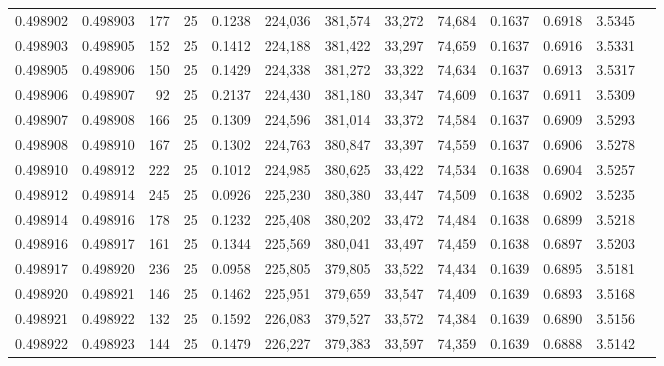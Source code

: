 \begin{tabular}{rrrrrrrrrrrrr}
0.498902 & 0.498903 & 177 &  25 &                                     0.1238 & 224,036 & 381,574 &  33,272 &  74,684 & 0.1637 & 0.6918 & 3.5345 \\
0.498903 & 0.498905 & 152 &  25 &                                     0.1412 & 224,188 & 381,422 &  33,297 &  74,659 & 0.1637 & 0.6916 & 3.5331 \\
0.498905 & 0.498906 & 150 &  25 &                                     0.1429 & 224,338 & 381,272 &  33,322 &  74,634 & 0.1637 & 0.6913 & 3.5317 \\
0.498906 & 0.498907 &  92 &  25 &                                     0.2137 & 224,430 & 381,180 &  33,347 &  74,609 & 0.1637 & 0.6911 & 3.5309 \\
0.498907 & 0.498908 & 166 &  25 &                                     0.1309 & 224,596 & 381,014 &  33,372 &  74,584 & 0.1637 & 0.6909 & 3.5293 \\
0.498908 & 0.498910 & 167 &  25 &                                     0.1302 & 224,763 & 380,847 &  33,397 &  74,559 & 0.1637 & 0.6906 & 3.5278 \\
0.498910 & 0.498912 & 222 &  25 &                                     0.1012 & 224,985 & 380,625 &  33,422 &  74,534 & 0.1638 & 0.6904 & 3.5257 \\
0.498912 & 0.498914 & 245 &  25 &                                     0.0926 & 225,230 & 380,380 &  33,447 &  74,509 & 0.1638 & 0.6902 & 3.5235 \\
0.498914 & 0.498916 & 178 &  25 &                                     0.1232 & 225,408 & 380,202 &  33,472 &  74,484 & 0.1638 & 0.6899 & 3.5218 \\
0.498916 & 0.498917 & 161 &  25 &                                     0.1344 & 225,569 & 380,041 &  33,497 &  74,459 & 0.1638 & 0.6897 & 3.5203 \\
0.498917 & 0.498920 & 236 &  25 &                                     0.0958 & 225,805 & 379,805 &  33,522 &  74,434 & 0.1639 & 0.6895 & 3.5181 \\
0.498920 & 0.498921 & 146 &  25 &                                     0.1462 & 225,951 & 379,659 &  33,547 &  74,409 & 0.1639 & 0.6893 & 3.5168 \\
0.498921 & 0.498922 & 132 &  25 &                                     0.1592 & 226,083 & 379,527 &  33,572 &  74,384 & 0.1639 & 0.6890 & 3.5156 \\
0.498922 & 0.498923 & 144 &  25 &                                     0.1479 & 226,227 & 379,383 &  33,597 &  74,359 & 0.1639 & 0.6888 & 3.5142 \\

\end{tabular}
